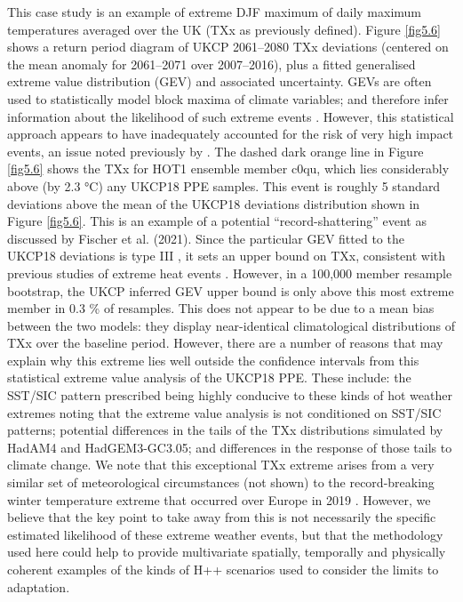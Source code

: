     This case study is an example of extreme DJF maximum of daily maximum temperatures averaged over the UK (TXx as previously defined). Figure \ref{fig5.6} shows a return period diagram of UKCP 2061--2080 TXx deviations (centered on the mean anomaly for 2061--2071 over 2007--2016), plus a fitted generalised extreme value distribution (GEV) and associated uncertainty. GEVs are often used to statistically model block maxima of climate variables; and therefore infer information about the likelihood of such extreme events \citep{brown_climate_2014}. However, this statistical approach appears to have inadequately accounted for the risk of very high impact events, an issue noted previously by \citet{sippel_combining_2015}. The dashed dark orange line in Figure \ref{fig5.6} shows the TXx for HOT1 ensemble member c0qu, which lies considerably above (by 2.3 °C) any UKCP18 PPE samples. This event is roughly 5 standard deviations above the mean of the UKCP18 deviations distribution shown in Figure \ref{fig5.6}. This is an example of a potential ``record-shattering'' event as discussed by Fischer et al. (2021). Since the particular GEV fitted to the UKCP18 deviations is type III \citep{coles_introduction_2001}, it sets an upper bound on TXx, consistent with previous studies of extreme heat events \citep{gessner_very_2021}. However, in a 100,000 member resample bootstrap, the UKCP inferred GEV upper bound is only above this most extreme member in 0.3 \% of resamples. This does not appear to be due to a mean bias between the two models: they display near-identical climatological distributions of TXx over the baseline period. However, there are a number of reasons that may explain why this extreme lies well outside the confidence intervals from this statistical extreme value analysis of the UKCP18 PPE. These include: the SST/SIC pattern prescribed being highly conducive to these kinds of hot weather extremes noting that the extreme value analysis is not conditioned on SST/SIC patterns; potential differences in the tails of the TXx distributions simulated by HadAM4 and HadGEM3-GC3.05; and differences in the response of those tails to climate change. We note that this exceptional TXx extreme arises from a very similar set of meteorological circumstances (not shown) to the record-breaking winter temperature extreme that occurred over Europe in 2019 \citep{kendon_temperature_2020,young_record-breaking_2020}. However, we believe that the key point to take away from this is not necessarily the specific estimated likelihood of these extreme weather events, but that the methodology used here could help to provide multivariate spatially, temporally and physically coherent examples of the kinds of H++ scenarios used to consider the limits to adaptation.

